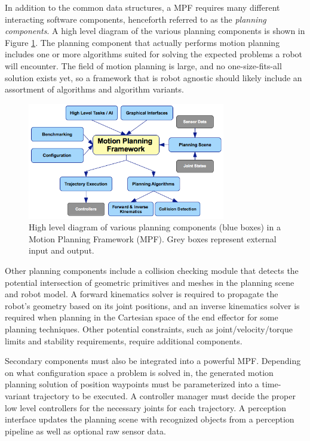 \documentclass[10pt,journal,compsoc]{joser1}
\begin{document}
{In addition to the common data structures, a MPF requires many different
interacting software components, henceforth referred to as the \textit{planning
components}. A high level diagram of the various planning components is shown in
Figure \ref{fig:motionplanning_highlevel}. The planning component that actually
performs motion planning includes one or more algorithms suited for solving the
expected problems a robot will encounter. The field of motion planning is large,
and no one-size-fits-all solution exists yet, so a framework that is robot
agnostic should likely include an assortment of algorithms and algorithm
variants.

\begin{figure}[!t]
\centering
\includegraphics[width=3.4in]{coleman_20131110_f05}
\caption{High level diagram of various planning components (blue boxes) in a Motion Planning
Framework (MPF). Grey boxes represent external input and output.}
\label{fig:motionplanning_highlevel}
\end{figure} 

Other planning components include a collision checking module that detects the
potential intersection of geometric primitives and meshes in the planning scene
and robot model. A forward kinematics solver is required to propagate the
robot's geometry based on its joint positions, and an inverse kinematics solver
is required when planning in the Cartesian space of the end effector for some planning techniques. Other potential constraints, such as
joint/velocity/torque limits and stability requirements, require additional
components.

Secondary components must also be integrated into a powerful MPF. Depending on
what configuration space a problem is solved in, the generated motion planning
solution of position waypoints must be parameterized into a time-variant
trajectory to be executed. A controller manager must decide the proper low level
controllers for the necessary joints for each trajectory. A perception interface
updates the planning scene with recognized objects from a perception pipeline as
well as optional raw sensor data.

}
\end{document}
